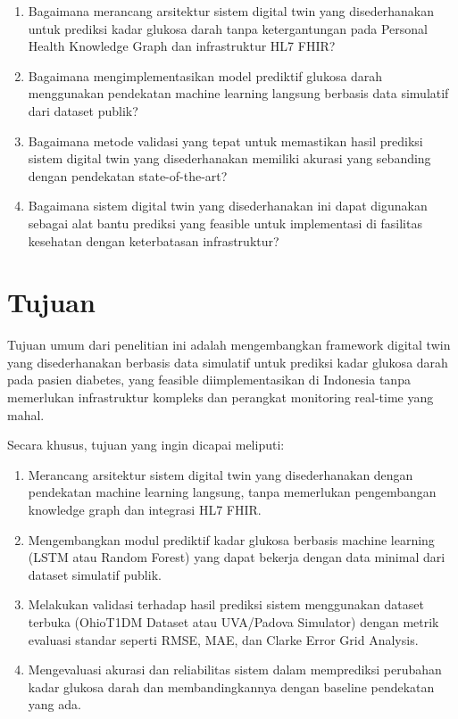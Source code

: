 \documentclass[12pt,a4paper,oneside]{book}
\begin{document}
\begin{enumerate}
    \item Bagaimana merancang arsitektur sistem digital twin yang disederhanakan untuk prediksi kadar glukosa darah tanpa ketergantungan pada Personal Health Knowledge Graph dan infrastruktur HL7 FHIR?
    
    \item Bagaimana mengimplementasikan model prediktif glukosa darah menggunakan pendekatan machine learning langsung berbasis data simulatif dari dataset publik?
    
    \item Bagaimana metode validasi yang tepat untuk memastikan hasil prediksi sistem digital twin yang disederhanakan memiliki akurasi yang sebanding dengan pendekatan state-of-the-art?
    
    \item Bagaimana sistem digital twin yang disederhanakan ini dapat digunakan sebagai alat bantu prediksi yang feasible untuk implementasi di fasilitas kesehatan dengan keterbatasan infrastruktur?
\end{enumerate}

\section{Tujuan}

Tujuan umum dari penelitian ini adalah mengembangkan framework digital twin yang disederhanakan berbasis data simulatif untuk prediksi kadar glukosa darah pada pasien diabetes, yang feasible diimplementasikan di Indonesia tanpa memerlukan infrastruktur kompleks dan perangkat monitoring real-time yang mahal.

Secara khusus, tujuan yang ingin dicapai meliputi:

\begin{enumerate}
    \item Merancang arsitektur sistem digital twin yang disederhanakan dengan pendekatan machine learning langsung, tanpa memerlukan pengembangan knowledge graph dan integrasi HL7 FHIR.
    
    \item Mengembangkan modul prediktif kadar glukosa berbasis machine learning (LSTM atau Random Forest) yang dapat bekerja dengan data minimal dari dataset simulatif publik.
    
    \item Melakukan validasi terhadap hasil prediksi sistem menggunakan dataset terbuka (OhioT1DM Dataset atau UVA/Padova Simulator) dengan metrik evaluasi standar seperti RMSE, MAE, dan Clarke Error Grid Analysis.
    
    \item Mengevaluasi akurasi dan reliabilitas sistem dalam memprediksi perubahan kadar glukosa darah dan membandingkannya dengan baseline pendekatan yang ada.
\end{enumerate}
\end{document}
